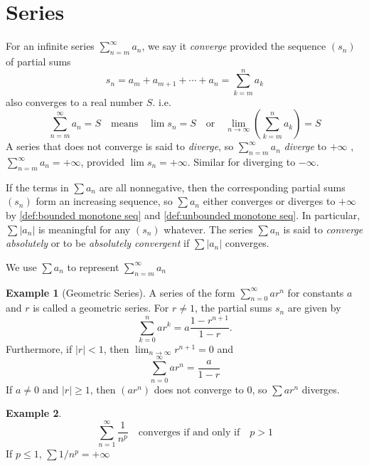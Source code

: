 \documentclass[12pt, lettersize]{book}
\theoremstyle{plain}
\theoremstyle{definition}
\newtheorem*{eg}{Example}
\theoremstyle{remark}
\begin{document}
	\section{Series}
		For an infinite series $\sum_{n=m}^{\infty}a_n$, we say it \emph{converge} provided the sequence $(s_n)$ of 
		partial sums
		\begin{displaymath}
			s_n=a_m+a_{m+1}+\cdots+a_n=\sum_{k=m}^{n}a_k
		\end{displaymath}
		also converges to a real number $S$. i.e.
		\begin{displaymath}
			\sum_{n=m}^{\infty}a_n=S\quad\text{means}\quad\lim s_n=S\quad\text{or}\quad\lim\limits_{n\rightarrow\infty}\left(\sum_{k=m}^{n}a_k\right)=S
		\end{displaymath}
		A series that does not converge is said to \emph{diverge}, so $\sum_{n=m}^{\infty}a_n$ \emph{diverge} to $+\infty$
		, $\sum_{n=m}^{\infty}a_n=+\infty$, provided $\lim s_n=+\infty$. Similar for diverging to $-\infty$.
		
		If the terms in $\sum a_n$ are all nonnegative, then the corresponding partial sums $(s_n)$ form an increasing sequence, so $\sum a_n$ either converges or diverges to $+\infty$ by \ref{def:bounded monotone seq} and \ref{def:unbounded monotone seq}. In particular, $\sum |a_n|$ is meaningful for any $(s_n)$ whatever. The series
		$\sum a_n$ is said to \emph{converge absolutely} or to be \emph{absolutely convergent} if $\sum |a_n|$ converges.
		
		We use $\sum a_n$ to represent $\sum_{n=m}^{\infty}a_n$
		
		\begin{eg}[Geometric Series]
		A series of the form $\sum_{n=0}^{\infty}ar^n$ for constants $a$ and $r$ is called a geometric series. For $r\neq1$,
		the partial sums $s_n$ are given by
		\begin{displaymath}
			\sum_{k=0}^{n}ar^k=a\frac{1-r^{n+1}}{1-r}.
		\end{displaymath}
		Furthermore, if $|r|<1$, then $\lim_{n\rightarrow \infty}r^{n+1}=0$ and
		\begin{displaymath}
			\sum_{n=0}^{\infty}ar^n=\frac{a}{1-r}
		\end{displaymath}
		If $a\neq0$ and $|r|\geq1$, then $(ar^n)$ does not converge to $0$, so $\sum ar^n$ diverges.
		\end{eg}
		
		\begin{eg}
		\begin{displaymath}
			\sum_{n=1}^{\infty}\frac{1}{n^p}\quad \text{converges if and only if}\quad p>1
		\end{displaymath}
		If $p\leq1$, $\sum1/n^p=+\infty$
		\end{eg}
		
\end{document}
